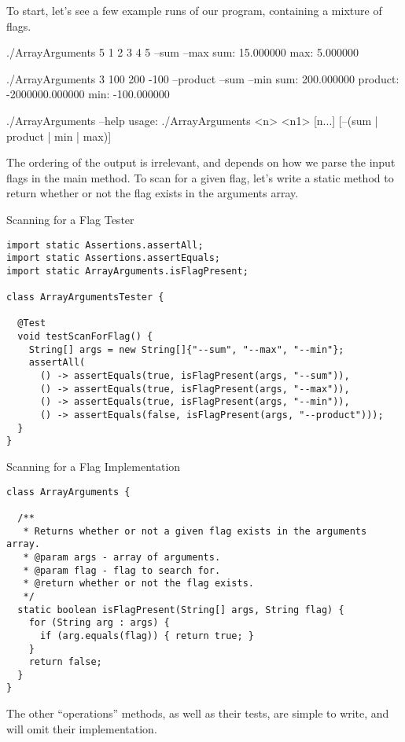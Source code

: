 To start, let's see a few example runs of our program, containing a mixture of flags.

\begin{verbnobox}[\small]
./ArrayArguments 5 1 2 3 4 5 --sum --max
sum: 15.000000
max: 5.000000

./ArrayArguments 3 100 200 -100 --product --sum --min
sum: 200.000000
product: -2000000.000000
min: -100.000000

./ArrayArguments --help
usage: ./ArrayArguments <n> <n1> [n...] [--(sum | product | min | max)]
\end{verbnobox}

The ordering of the output is irrelevant, and depends on how we parse the input flags in the main method. To scan for a given flag, let's write a static method to return whether or not the flag exists in the arguments array.

\begin{cl}[]{Scanning for a Flag Tester} 
\begin{lstlisting}[language=MyJava]
import static Assertions.assertAll;
import static Assertions.assertEquals;
import static ArrayArguments.isFlagPresent;

class ArrayArgumentsTester {

  @Test
  void testScanForFlag() {
    String[] args = new String[]{"--sum", "--max", "--min"};
    assertAll(
      () -> assertEquals(true, isFlagPresent(args, "--sum")),
      () -> assertEquals(true, isFlagPresent(args, "--max")),
      () -> assertEquals(true, isFlagPresent(args, "--min")),
      () -> assertEquals(false, isFlagPresent(args, "--product")));
  }
}
\end{lstlisting}
\end{cl}

\begin{cl}[]{Scanning for a Flag Implementation}
\begin{lstlisting}[language=MyJava]
class ArrayArguments {

  /**
   * Returns whether or not a given flag exists in the arguments array.
   * @param args - array of arguments.
   * @param flag - flag to search for.
   * @return whether or not the flag exists.
   */
  static boolean isFlagPresent(String[] args, String flag) {
    for (String arg : args) {
      if (arg.equals(flag)) { return true; }
    }
    return false;
  }
}
\end{lstlisting}
\end{cl}

The other ``operations'' methods, as well as their tests, are simple to write, and will omit their implementation. 


